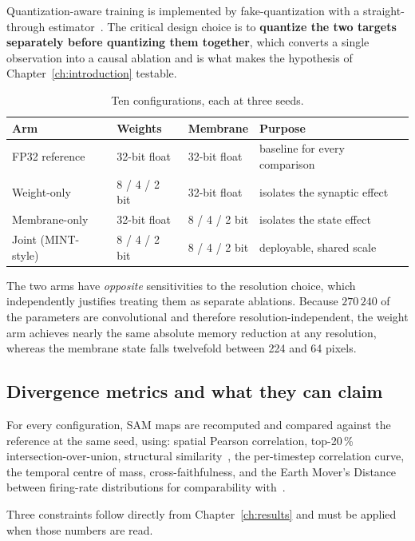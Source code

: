 Quantization-aware training is implemented by fake-quantization with a
straight-through estimator~\cite{bengio2013ste}. The critical design choice is to
\textbf{quantize the two targets separately before quantizing them together},
which converts a single observation into a causal ablation and is what makes the
hypothesis of Chapter~\ref{ch:introduction} testable.

\begin{table}[htbp]
\centering
\begin{tabular}{llll}
\toprule
Arm & Weights & Membrane & Purpose \\
\midrule
FP32 reference & 32-bit float & 32-bit float & baseline for every comparison \\
Weight-only & 8 / 4 / 2 bit & 32-bit float & isolates the synaptic effect \\
Membrane-only & 32-bit float & 8 / 4 / 2 bit & isolates the state effect \\
Joint (MINT-style) & 8 / 4 / 2 bit & 8 / 4 / 2 bit & deployable, shared scale \\
\bottomrule
\end{tabular}
\caption{Ten configurations, each at three seeds.}
\label{tab:grid}
\end{table}

The two arms have \emph{opposite} sensitivities to the resolution choice, which
independently justifies treating them as separate ablations. Because $270\,240$
of the parameters are convolutional and therefore resolution-independent, the
weight arm achieves nearly the same absolute memory reduction at any resolution,
whereas the membrane state falls twelvefold between 224 and 64 pixels.

\subsection{Divergence metrics and what they can claim}

For every configuration, SAM maps are recomputed and compared against the
reference at the same seed, using: spatial Pearson correlation, top-20\,\%
intersection-over-union, structural similarity~\cite{wang2004ssim}, the
per-timestep correlation curve, the temporal centre of mass, cross-faithfulness,
and the Earth Mover's Distance between firing-rate distributions for
comparability with~\cite{smith2026}.

Three constraints follow directly from Chapter~\ref{ch:results} and must be
applied when those numbers are read.

